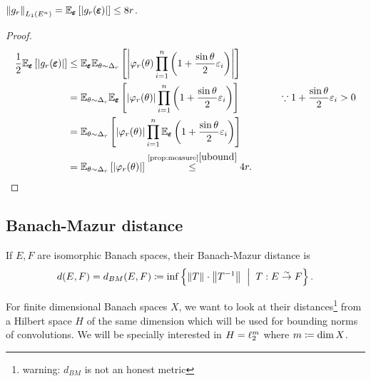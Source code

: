 \begin{cor}
$\left\lVert g_{r} \right\rVert_{L_{1}(E^{n})} = \mathbb E_{\pmb {\varepsilon}}\left[\left| g_{r}(\pmb{\varepsilon}) \right|\right] \le 8r$.
\end{cor}
\begin{proof}
\begin{align*}
\frac12\mathbb E_{\pmb \epsilon} \left[\abs{g_{r}(\pmb \epsilon)}\right] &\le \mathbb E_{\pmb \epsilon}\mathbb E_{\theta\sim\Delta_{r}}\left[\abs{\phi_{r}(\theta)\prod_{i=1}^{n}\left(1+\frac{\sin\theta}{2}\epsilon_{i}\right)}\right]\\
&= \mathbb E_{\theta\sim\Delta_{r}}\mathbb E_{\pmb \epsilon} \left[\abs{\phi_{r}(\theta)}\prod_{i=1}^{n}\left(1+\frac{\sin\theta}{2}\epsilon_{i}\right)\right] \qquad\qquad \because 1+\frac{\sin\theta}{2}\epsilon_{i} > 0\\
&= \mathbb E_{\theta\sim\Delta_{r}}\left[\abs{\phi_{r}(\theta)}\prod_{i=1}^{n}\mathbb E_{\pmb \epsilon} \left(1+\frac{\sin\theta}{2}\epsilon_{i}\right)\right]\\
&= \mathbb E_{\theta\sim\Delta_{r}}\left[\abs{\phi_{r}(\theta)}\right] \stackrel{\text{\cref{prop:measure}}\ref{ubound}}{\le} 4r.
\end{align*}
\end{proof}

\subsection*{Banach-Mazur distance}

\begin{defn}
If $E,F$ are isomorphic Banach spaces, their Banach-Mazur distance is $$d(E,F) = d_{BM}(E,F) \sett \inf\set{\norm T{}\cdot\norm{T^{-1}}{}\st T: E\stackrel{\sim}{\to} F}.$$
\end{defn}

For finite dimensional Banach spaces $X$, we want to look at their distances\footnote{warning: $d_{BM}$ is not an honest metric} from a Hilbert space $H$ of the same dimension which will be used for bounding norms of convolutions. We will be specially interested in $H=\ell_{2}^m$ where $m\coloneqq \dim X$. 

